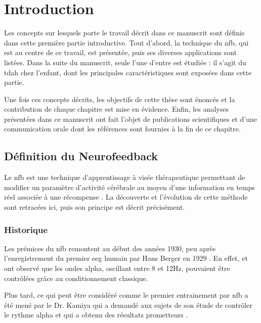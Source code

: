 \chapter{Introduction} \label{chapitre-1}

Les concepts sur lesquels porte le travail décrit dans ce manuscrit sont définis dans cette première partie introductive. Tout d'abord, la technique du \gls{nfb}, 
qui est au centre de ce travail, est présentée, puis ses diverses applications sont listées. Dans la suite du manuscrit, seule l'une d'entre est étudiée : 
il s'agit du \gls{tdah} chez l'enfant, dont les principales caractéristiques sont exposées dans cette partie. 

Une fois ces concepts décrits, les objectifs de cette thèse sont énoncés et la contribution de chaque chapitre est mise en évidence. Enfin, les analyses 
présentées dans ce manuscrit ont fait l'objet de publications scientifiques et d'une communication orale dont les références sont fournies à la fin de ce chapitre. 

\clearpage 

\section{Définition du Neurofeedback}

Le \gls{nfb} est une technique d’apprentissage à visée thérapeutique permettant de modifier un paramètre d’activité cérébrale au moyen d’une 
information en temps réel associée à une récompense \citep{Arns2014}. 
La découverte et l'évolution de cette méthode sont retracées ici, puis son principe est décrit précisément.

\subsection{Historique}

Les prémices du \gls{nfb} remontent au début des années 1930, peu après l'enregistrement du premier \gls{eeg} humain par Hans Berger en 1929 \citep{Berger1929}.
En effet, \citet{Durup1935} et \citet{Loomis1936} ont observé que les ondes alpha, oscillant entre 8 et 12Hz, pouvaient être contrôlées grâce au 
conditionnement classique. 

Plus tard, ce qui peut être considéré comme le premier entrainement par \gls{nfb} a été mené par le Dr. Kamiya qui a demandé aux sujets de son étude 
de contrôler le rythme alpha et qui a obtenu des résultats prometteurs \citep{Kamiya1969}. 

